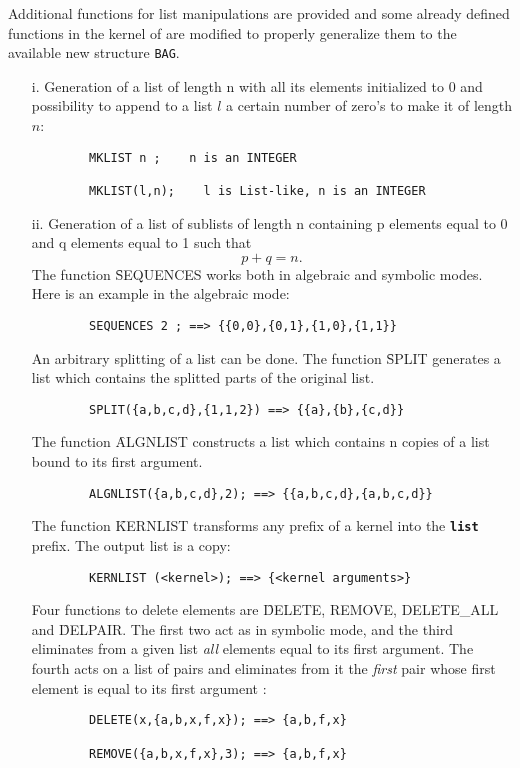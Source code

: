 Additional functions for list manipulations are provided and some already
defined functions in the kernel of \REDUCE are modified to properly
generalize them to the available new structure {\tt BAG}.
\begin{itemize}
\item[i.]
Generation of a list of length n with all its elements initialized to 0
and possibility to append to a list $l$ a certain number of
zero's to make it of length $n$:
\begin{verbatim}
        MKLIST n ;    n is an INTEGER

        MKLIST(l,n);    l is List-like, n is an INTEGER
\end{verbatim}

\item[ii.]
Generation of a list of sublists of length n containing p elements
equal to 0 and q elements equal to 1 such that  \[p+q=n .\]
The function \f{SEQUENCES} works both in algebraic and
symbolic modes.  Here is an example in the algebraic mode:
\begin{verbatim}
        SEQUENCES 2 ; ==> {{0,0},{0,1},{1,0},{1,1}}
\end{verbatim}
An arbitrary splitting of a list can be done. The function \f{SPLIT} 
generates a list which contains the splitted parts of the original list.
\begin{verbatim}
        SPLIT({a,b,c,d},{1,1,2}) ==> {{a},{b},{c,d}}
\end{verbatim}
The function \f{ALGNLIST} constructs a list which contains n copies  
of a list bound to its first argument.
\begin{verbatim}
        ALGNLIST({a,b,c,d},2); ==> {{a,b,c,d},{a,b,c,d}}
\end{verbatim}
The function \f{KERNLIST} transforms any prefix of a kernel into the
{\bf \verb+list+} prefix. The output list is a copy:
\begin{verbatim}
        KERNLIST (<kernel>); ==> {<kernel arguments>}
\end{verbatim}
Four functions to delete elements are \f{DELETE, REMOVE, DELETE\_ALL} and
\f{DELPAIR}. The first two act as in symbolic mode, and the third
eliminates from a given list {\em all}
elements equal to its first argument. The fourth acts on a list of pairs
and eliminates from it the {\em first} pair whose first element is equal to
its first argument :
\begin{verbatim}
        DELETE(x,{a,b,x,f,x}); ==> {a,b,f,x}

        REMOVE({a,b,x,f,x},3); ==> {a,b,f,x}


\end{verbatim}
\end{itemize}
